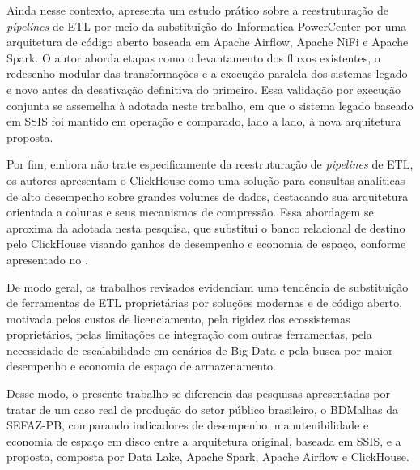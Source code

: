 Ainda nesse contexto,  apresenta um estudo prático sobre a reestruturação de 
\textit{pipelines} de ETL por meio da substituição do Informatica PowerCenter por uma arquitetura de código aberto 
baseada em Apache Airflow, Apache NiFi e Apache Spark. O autor aborda etapas como o levantamento dos fluxos existentes, 
o redesenho modular das transformações e a execução paralela dos sistemas legado e novo antes da desativação definitiva
do primeiro. Essa validação por execução conjunta se assemelha à adotada neste trabalho, em que o sistema legado
baseado em SSIS foi mantido em operação e comparado, lado a lado, à nova arquitetura proposta.

Por fim, embora  não trate especificamente da reestruturação de \textit{pipelines} de ETL,
os autores apresentam o ClickHouse como uma solução para consultas analíticas de alto desempenho sobre grandes volumes 
de dados, destacando sua arquitetura orientada a colunas e seus mecanismos de compressão. Essa abordagem se aproxima 
da adotada nesta pesquisa, que substitui o banco relacional de destino pelo ClickHouse visando ganhos de desempenho 
e economia de espaço, conforme apresentado no .

De modo geral, os trabalhos revisados evidenciam uma tendência de substituição de ferramentas de ETL proprietárias
por soluções modernas e de código aberto, motivada pelos custos de licenciamento, pela rigidez dos ecossistemas
proprietários, pelas limitações de integração com outras ferramentas, pela necessidade de escalabilidade em cenários
de Big Data e pela busca por maior desempenho e economia de espaço de armazenamento.

Desse modo, o presente trabalho se diferencia das pesquisas apresentadas por tratar de um caso real de produção do 
setor público brasileiro, o BDMalhas da SEFAZ-PB, comparando indicadores de desempenho, manutenibilidade e economia de
espaço em disco entre a arquitetura original, baseada em SSIS, e a proposta, composta por Data Lake, Apache Spark, 
Apache Airflow e ClickHouse.



